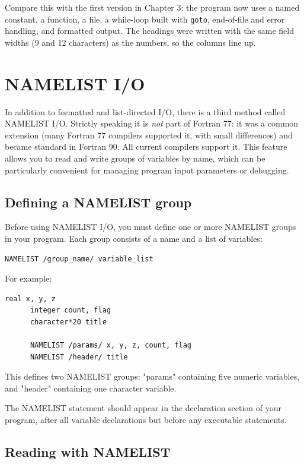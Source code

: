 Compare this with the first version in Chapter 3: the program now uses a named constant, a function, a file, a while-loop built with \texttt{goto}, end-of-file and error handling, and formatted output. The headings were written with the same field widths (9 and 12 characters) as the numbers, so the columns line up.

\section{NAMELIST I/O}

In addition to formatted and list-directed I/O, there is a third method called NAMELIST I/O. Strictly speaking it is \emph{not} part of Fortran 77: it was a common extension (many Fortran 77 compilers supported it, with small differences) and became standard in Fortran 90. All current compilers support it. This feature allows you to read and write groups of variables by name, which can be particularly convenient for managing program input parameters or debugging.

\subsection{Defining a NAMELIST group}

Before using NAMELIST I/O, you must define one or more NAMELIST groups in your program. Each group consists of a name and a list of variables:

\begin{lstlisting}[style=fortran77]
      NAMELIST /group_name/ variable_list
\end{lstlisting}

For example:

\begin{lstlisting}[style=fortran77]
      real x, y, z
      integer count, flag
      character*20 title
      
      NAMELIST /params/ x, y, z, count, flag
      NAMELIST /header/ title
\end{lstlisting}

This defines two NAMELIST groups: "params" containing five numeric variables, and "header" containing one character variable.

The NAMELIST statement should appear in the declaration section of your program, after all variable declarations but before any executable statements.

\subsection{Reading with NAMELIST}

